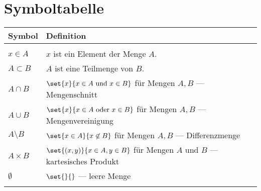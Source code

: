 \documentclass[crop=false,10pt,ngerman]{standalone}
\begin{document}
	\section*{Symboltabelle}
	\renewcommand{\arraystretch}{1.3}
	\begin{table}[H]
		\begin{tabularx}{\textwidth}{p{}p{}}
			\hline
			\textbf{Symbol} & \textbf{Definition} \\
			\hline
			\hline \\

			$x\in A$ & $x$ ist ein Element der Menge $A$. \\

			$A\subset B$ & $A$ ist eine Teilmenge von $B$. \\

			$A\cap B$ & $\set{x}{x\in A \text{ und } x\in B}$ für Mengen $A,B$ --- Mengenschnitt \\

			$A\cup B$ & $\set{x}{x\in A \text{ oder } x\in B}$ für Mengen $A,B$ --- Mengenvereinigung \\

			$A\setminus B$ & $\set{x\in A}{x\not\in B}$ für Mengen $A,B$ --- Differenzmenge \\

			$A\times B$ & $\set{(x,y)}{x\in A,y\in B}$ für Mengen $A$ und $B$ --- kartesisches Produkt \\

			$\emptyset$ & $\set{}{}$ --- leere Menge \\
			\\
			\hline
		\end{tabularx}
	\end{table}
\end{document}
